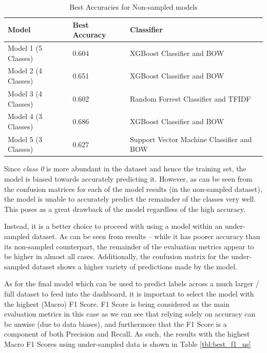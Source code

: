 \documentclass[12pt]{article}
\begin{document}
\begin{table}[tbp]
\centering
\begin{tabularx}{\linewidth}{ l l X}
\toprule
   Model & Best Accuracy & Classifier \\
\midrule

Model 1 (5 Classes) & 0.604 & XGBoost Classifier and BOW \\
Model 2 (4 Classes) & 0.651 & XGBoost Classifier and BOW \\
Model 3 (4 Classes) & 0.602 & Random Forrest Classifier and TFIDF \\
Model 4 (3 Classes) & 0.686 & XGBoost Classifier and BOW \\ 
Model 5 (3 Classes) & 0.627 & Support Vector Machine Classifier and BOW \\

\bottomrule
\end{tabularx}
\caption{Best Accuracies for Non-sampled models}
\label{tbl:best_acc_ns}
\end{table}


 

Since \textit{class 0} is more abundant in the dataset and hence the training set, the model is biased towards accurately predicting it. However, as can be seen from the confusion matrices for each of the model results (in the non-sampled dataset), the model is unable to accurately predict the remainder of the classes very well. This poses as a great drawback of the model regardless of the high accuracy. 

Instead, it is a better choice to proceed with using a model within an under-sampled dataset. As can be seen from results – while it has poorer accuracy than its non-sampled counterpart, the remainder of the evaluation metrics appear to be higher in almost all cases. Additionally, the confusion matrix for the under-sampled dataset shows a higher variety of predictions made by the model. 

As for the final model which can be used to predict labels across a much larger / full dataset to feed into the dashboard, it is important to select the model with the highest (Macro) F1 Score. F1 Score is being considered as the main evaluation metrics in this case as we can see that relying solely on accuracy can be unwise (due to data biases), and furthermore that the F1 Score is a component of both Precision and Recall. As such, the results with the highest Macro F1 Scores using under-sampled data is shown in Table \ref{tbl:best_f1_us}
\end{document}
